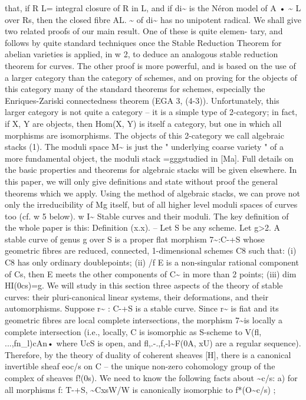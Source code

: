 \documentclass[11pt]{article}
\theoremstyle{plain}
\theoremstyle{definition}
\theoremstyle{remark}
\begin{document}
that, if R L= integral closure of R in L, and if di\textasciitilde{} is the Néron model of A • \textasciitilde{} L over Rs, then the closed fibre AL. \textasciitilde{} of di\textasciitilde{} has no unipotent radical. We shall give two related proofs of our main result. One of these is quite elemen- tary, and follows by quite standard techniques once the Stable Reduction Theorem for abelian varieties is applied, in w 2, to deduce an analogous stable reduction theorem for curves. The other proof is more powerful, and is based on the use of a larger category than the category of schemes, and on proving for the objects of this category many of the standard theorems for schemes, especially the Enriques-Zariski connectedness theorem (EGA 3, (4-3)). Unfortunately, this larger category is not quite a category -- it is a simple type of 2-category; in fact, if X, Y are objects, then Hom(X, Y) is itself a category, but one in which all morphisms are isomorphisms. The objects of this 2-category we call algebraic stacks (1). The moduli space M\textasciitilde{} is just the " underlying coarse variety " of a more fundamental object, the moduli stack =gggstudied in [Ma]. Full details on the basic properties and theorems for algebraic stacks will be given elsewhere. In this paper, we will only give definitions and state without proof the general theorems which we apply. Using the method of algebraic stacks, we can prove not only the irreducibility of Mg itself, but of all higher level moduli spaces of curves too (cf. w 5 below). w I\textasciitilde{} Stable curves and their moduli. The key definition of the whole paper is this: Definition (x.x). -- Let S be any scheme. Let g>2. A stable curve of genus g over S is a proper flat morphism 7\textasciitilde{}:C-+S whose geometric fibres are reduced, connected, 1-dimensional schemes C8 such that: (i) C8 has only ordinary doublepoints; (ii) /f E is a non-singular rational component of Cs, then E meets the other components of C\textasciitilde{} in more than 2 points; (iii) dim HI(0cs)=g. We will study in this section three aspects of the theory of stable curves: their pluri-canonical linear systems, their deformations, and their automorphisms. Suppose r\textasciitilde{} : C-+S is a stable curve. Since r\textasciitilde{} is fiat and its geometric fibres are local complete intersections, the morphism 7\textasciitilde{}is locally a complete intersection (i.e., locally, C is isomorphic as S-scheme to V(fl, ...,fn\_l)cAn• where UcS is open, and fl,.-.,f,-l\textasciitilde{}F(0A, xU) are a regular sequence). Therefore, by the theory of duality of coherent sheaves [H], there is a canonical invertible sheaf eoc/s on C -- the unique non-zero cohomology group of the complex of sheaves f!(0s). We need to know the following facts about \textasciitilde{}c/s: a) for all morphisms f: T-+S, \textasciitilde{}CxsW/W is canonically isomorphic to f*(O\textasciitilde{}c/s) ;
\end{document}
